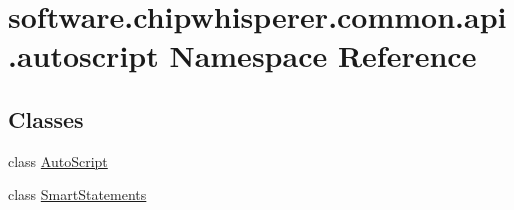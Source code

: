\hypertarget{namespacesoftware_1_1chipwhisperer_1_1common_1_1api_1_1autoscript}{}\section{software.\+chipwhisperer.\+common.\+api.\+autoscript Namespace Reference}
\label{namespacesoftware_1_1chipwhisperer_1_1common_1_1api_1_1autoscript}
\subsection*{Classes}
\begin{DoxyCompactItemize}
\item 
class \hyperlink{classsoftware_1_1chipwhisperer_1_1common_1_1api_1_1autoscript_1_1AutoScript}{Auto\+Script}
\item 
class \hyperlink{classsoftware_1_1chipwhisperer_1_1common_1_1api_1_1autoscript_1_1SmartStatements}{Smart\+Statements}
\end{DoxyCompactItemize}

